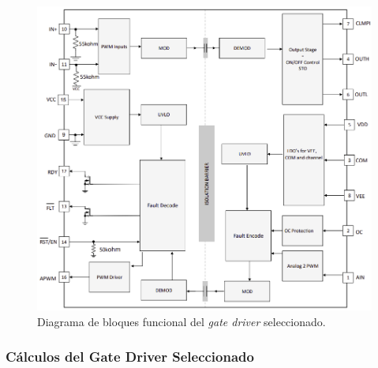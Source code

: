 \begin{figure}[H]
	\centering
	\includegraphics[width=0.7\linewidth]{fig/UCC21710-block}
	\caption{Diagrama de bloques funcional del \textit{gate driver} seleccionado.}
\end{figure}


\subsubsection{Cálculos del Gate Driver Seleccionado}


